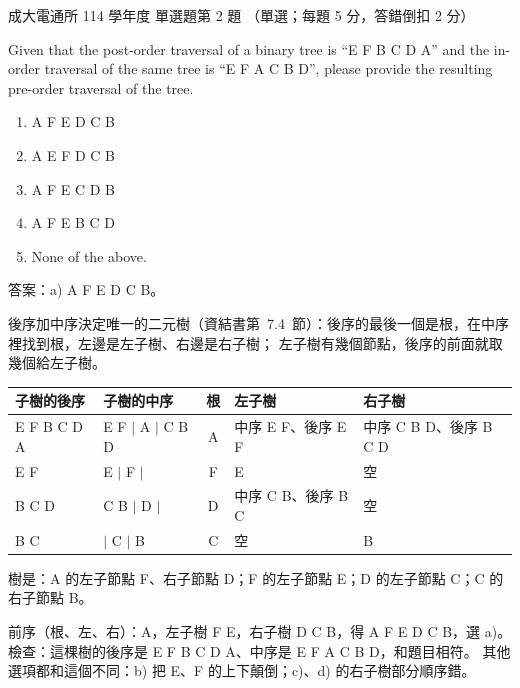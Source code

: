 \begin{pastexam}[label={px:ncku-114-cce-ds-02}]{成大電通所 114 學年度 單選題第 2 題}
（單選；每題 5 分，答錯倒扣 2 分）

Given that the post-order traversal of a binary tree is ``E F B C D A'' and the in-order traversal of the same
tree is ``E F A C B D'', please provide the resulting pre-order traversal of the tree.
\begin{enumerate}[label=\alph*),nosep]
\item A F E D C B
\item A E F D C B
\item A F E C D B
\item A F E B C D
\item None of the above.
\end{enumerate}
\end{pastexam}

\begin{pastsoln}
答案：a) A F E D C B。

後序加中序決定唯一的二元樹（資結書第~7.4~節）：後序的最後一個是根，在中序裡找到根，左邊是左子樹、右邊是右子樹；
左子樹有幾個節點，後序的前面就取幾個給左子樹。
\begin{center}
\begin{tabular}{llcll}
\toprule
子樹的後序 & 子樹的中序 & 根 & 左子樹 & 右子樹 \\
\midrule
E F B C D A & E F $\mid$ A $\mid$ C B D & A & 中序 E F、後序 E F & 中序 C B D、後序 B C D \\
E F & E $\mid$ F $\mid$ & F & E & 空 \\
B C D & C B $\mid$ D $\mid$ & D & 中序 C B、後序 B C & 空 \\
B C & $\mid$ C $\mid$ B & C & 空 & B \\
\bottomrule
\end{tabular}
\end{center}
樹是：A 的左子節點 F、右子節點 D；F 的左子節點 E；D 的左子節點 C；C 的右子節點 B。
\begin{center}
\end{center}
前序（根、左、右）：A，左子樹 F E，右子樹 D C B，得 A F E D C B，選 a)。 檢查：這棵樹的後序是 E F B C D A、中序是
E F A C B D，和題目相符。 其他選項都和這個不同：b) 把 E、F 的上下顛倒；c)、d) 的右子樹部分順序錯。
\end{pastsoln}
